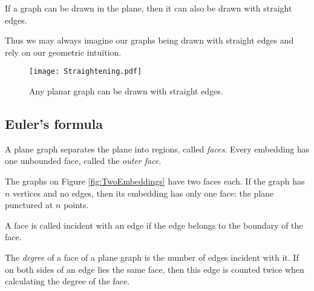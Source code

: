 \begin{page}
\setcounter{section}{3}
\setcounter{subsection}{1}
\setcounter{dfn}{4}
\label{portion:286}

\begin{thm}[F\'ary]
If a graph can be drawn in the plane, then it can also be drawn with straight edges.
\end{thm}

\end{page}

\begin{page}
\setcounter{section}{3}
\setcounter{subsection}{2}
\setcounter{dfn}{4}
\label{portion:287}

Thus we may always imagine our graphs being drawn with straight edges and rely on our geometric intuition.

\begin{figure}[ht]
\begin{center}
\texttt{[image: Straightening.pdf]}
\end{center}
\caption{Any planar graph can be drawn with straight edges.}
\label{fig:Straightening}
\end{figure}



\end{page}

\begin{page}
\setcounter{section}{3}
\setcounter{subsection}{2}
\setcounter{dfn}{4}
\label{portion:288}

\subsection{Euler's formula}
A plane graph separates the plane into regions, called \emph{faces}.
Every embedding has one unbounded face, called the \emph{outer face}.

The graphs on Figure \ref{fig:TwoEmbeddings} have two faces each.
If the graph has $n$ vertices and no edges, then its embedding has only one face: the plane punctured at $n$ points.

A face is called incident with an edge if the edge belongs to the boundary of the face.

\end{page}

\begin{page}
\setcounter{section}{3}
\setcounter{subsection}{2}
\setcounter{dfn}{5}
\label{portion:290}

\begin{dfn}
The \emph{degree} of a face of a plane graph is the number of edges incident with it.
If on both sides of an edge lies the same face, then this edge is counted twice when calculating the degree of the face.
\end{dfn}

\end{page}

